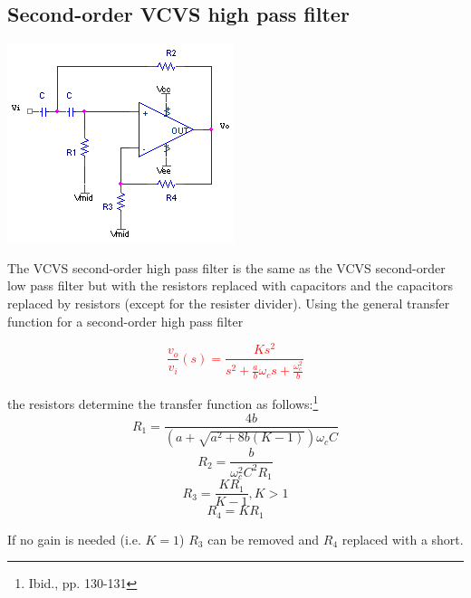 \subsection{Second-order VCVS high pass filter}
\begin{center}
	\includegraphics{schematics/2ndorder_vcvs_HPfilter.PNG}
\end{center}
The VCVS second-order high pass filter is the same as the VCVS second-order low pass filter but with the resistors replaced with capacitors and the capacitors replaced by resistors (except for the resister divider). Using the  general transfer function for a second-order high pass filter

\textcolor{red}{
\begin{equation}
\frac{v_{o}}{v_{i}}(s) = \frac{Ks^{2}}{s^{2} + \frac{a}{b}\omega_{c}s + \frac{\omega_{c}^{2}}{b}}
\label{eq:2ndorder_vcvs_HPfilter}
\end{equation}
}

the resistors determine the transfer function as follows:\footnote{Ibid., pp. 130-131}
\begin{equation}
R_{1} = \frac{4b}{(a+\sqrt{a^{2}+8b(K-1)})\omega_{c}C}
\end{equation}
\begin{equation}
R_{2} = \frac{b}{\omega_{c}^{2}C^{2}R_{1}}
\end{equation}
\begin{equation}
R_{3} = \frac{KR_{1}}{K-1}, K > 1
\end{equation}
\begin{equation}
R_{4} = KR_{1}
\end{equation}

If no gain is needed (i.e. $K = 1$) $R_{3}$ can be removed and $R_{4}$ replaced with a short.

